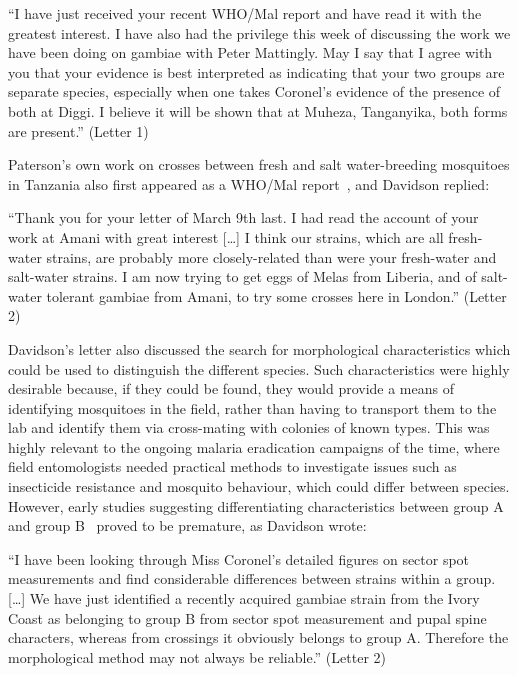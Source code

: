 \begin{refsection}
\begin{displayquote}
``I have just received your recent WHO/Mal report and have read it with the greatest interest. I have also had the privilege this week of discussing the work we have been doing on gambiae with Peter Mattingly. May I say that I agree with you that your evidence is best interpreted as indicating that your two groups are separate species, especially when one takes Coronel's evidence of the presence of both at Diggi. I believe it will be shown that at Muheza, Tanganyika, both forms are present.'' (Letter 1)
\end{displayquote}


Paterson's own work on crosses between fresh and salt water-breeding mosquitoes in Tanzania also first appeared as a WHO/Mal report~\parencite{Paterson1962a}, and Davidson replied:


\begin{displayquote}
``Thank you for your letter of March 9th last. I had read the account of your work at Amani with great interest [\ldots] I think our strains, which are all fresh-water strains, are probably more closely-related than were your fresh-water and salt-water strains. I am now trying to get eggs of Melas from Liberia, and of salt-water tolerant gambiae from Amani, to try some crosses here in London.'' (Letter 2)
\end{displayquote}


Davidson's letter also discussed the search for morphological characteristics which could be used to distinguish the different species.
%
Such characteristics were highly desirable because, if they could be found, they would provide a means of identifying mosquitoes in the field, rather than having to transport them to the lab and identify them via cross-mating with colonies of known types.
%
This was highly relevant to the ongoing malaria eradication campaigns of the time, where field entomologists needed practical methods to investigate issues such as insecticide resistance and mosquito behaviour, which could differ between species.
%
However, early studies suggesting differentiating characteristics between group A and group B~\parencite{Coronel1962} proved to be premature, as Davidson wrote:



\begin{displayquote}
``I have been looking through Miss Coronel's detailed figures on sector spot measurements and find considerable differences between strains within a group. [\ldots] We have just identified a recently acquired gambiae strain from the Ivory Coast as belonging to group B from sector spot measurement and pupal spine characters, whereas from crossings it obviously belongs to group A. Therefore the morphological method may not always be reliable.'' (Letter 2)
\end{displayquote}



\end{refsection}
